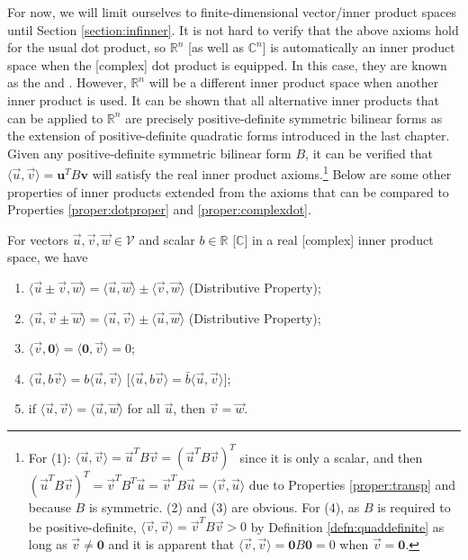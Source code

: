 For now, we will limit ourselves to finite-dimensional vector/inner product spaces until Section \ref{section:infinner}. It is not hard to verify that the above axioms hold for the usual dot product, so $\mathbb{R}^n$ [as well as $\mathbb{C}^n$] is automatically an inner product space when the [complex] dot product is equipped. In this case, they are known as the  and . However, $\mathbb{R}^n$ will be a different inner product space when another inner product is used. It can be shown that all alternative inner products that can be applied to $\mathbb{R}^n$ are precisely positive-definite symmetric bilinear forms as the extension of positive-definite quadratic forms introduced in the last chapter. Given any positive-definite symmetric bilinear form $B$, it can be verified that $\langle \vec{u}, \vec{v} \rangle = \textbf{u}^TB\textbf{v}$ will satisfy the real inner product axioms.\footnote{For (1): $\langle \vec{u}, \vec{v} \rangle = \vec{u}^TB\vec{v} = (\vec{u}^TB\vec{v})^T$ since it is only a scalar, and then $(\vec{u}^TB\vec{v})^T = \vec{v}^TB^T\vec{u} = \vec{v}^TB\vec{u} = \langle \vec{v}, \vec{u} \rangle$ due to Properties \ref{proper:transp} and because $B$ is symmetric. (2) and (3) are obvious. For (4), as $B$ is required to be positive-definite, $\langle \vec{v}, \vec{v} \rangle = \vec{v}^TB\vec{v} > 0$ by Definition \ref{defn:quaddefinite} as long as $\vec{v} \neq \textbf{0}$ and it is apparent that $\langle \vec{v}, \vec{v} \rangle = \textbf{0}B\textbf{0} = 0$ when $\vec{v} = \textbf{0}$.} Below are some other properties of inner products extended from the axioms that can be compared to Properties \ref{proper:dotproper} and \ref{proper:complexdot}.
\begin{proper}
\label{proper:innerprod2}
For vectors $\vec{u}, \vec{v}, \vec{w} \in \mathcal{V}$ and scalar $b \in \mathbb{R}$ [$\mathbb{C}$] in a real [complex] inner product space, we have
\begin{enumerate}
    \item $\langle \vec{u} \pm \vec{v}, \vec{w} \rangle = \langle \vec{u}, \vec{w} \rangle \pm \langle \vec{v}, \vec{w} \rangle$ (Distributive Property);
    \item $\langle \vec{u}, \vec{v} \pm \vec{w} \rangle = \langle \vec{u}, \vec{v} \rangle \pm \langle \vec{u}, \vec{w} \rangle$ (Distributive Property);
    \item $\langle \vec{v}, \textbf{0} \rangle = \langle \textbf{0}, \vec{v} \rangle = 0$;
    \item $\langle \vec{u}, b\vec{v} \rangle = b\langle \vec{u}, \vec{v} \rangle$ [$\langle \vec{u}, b\vec{v} \rangle = \bar{b}\langle \vec{u}, \vec{v} \rangle$];
    \item if $\langle \vec{u}, \vec{v} \rangle = \langle \vec{u}, \vec{w} \rangle$ for all $\vec{u}$, then $\vec{v} = \vec{w}$.
\end{enumerate}
\end{proper}
